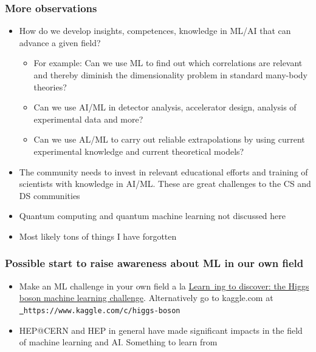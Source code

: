 \documentclass[11pt]{beamer} %
\begin{document}
\begin{frame}
\frametitle{More observations}

\begin{block}{}
\begin{itemize}
\item How do we develop insights, competences, knowledge in ML/AI  that can advance a given field?
\begin{itemize}

  \item For example: Can we use ML to find out which correlations are relevant and thereby diminish the dimensionality problem in standard many-body  theories?

  \item Can we use AI/ML in detector analysis, accelerator design, analysis of experimental data and more?

  \item Can we use AL/ML to carry out reliable extrapolations by using current experimental knowledge and current theoretical models?

\end{itemize}

\noindent
\item The community needs to invest in relevant educational efforts and training of scientists with knowledge in AI/ML. These are great challenges to the CS and DS communities

\item Quantum computing and quantum machine learning not discussed here

\item Most likely tons of things I have forgotten
\end{itemize}

\noindent
\end{block}
\end{frame}
\begin{frame}
\frametitle{Possible start to raise awareness about ML in our own field}

\begin{block}{}
\begin{itemize}
\item Make an ML challenge in your own field a la \href{{https://home.cern/news/news/computing/higgs-boson-machine-learning-challenge}}{Learn\
ing to discover: the Higgs boson machine learning challenge}. Alternatively go to kaggle.com at \href{{https://www.kaggle.com/c/higgs-boson}}\
{\nolinkurl{https://www.kaggle.com/c/higgs-boson}}

\item HEP@CERN and HEP in general have made significant impacts in the field of machine learning and AI. Something to learn from
\end{itemize}

\noindent
\end{block}
\end{frame}
\end{document}
